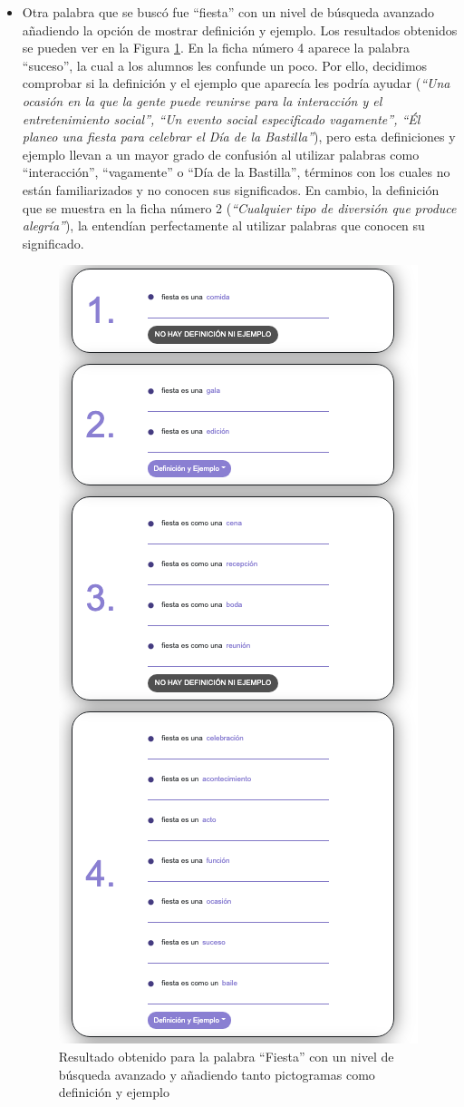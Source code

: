 \begin{itemize}
	\item Otra palabra que se buscó fue ``fiesta'' con un nivel de búsqueda avanzado añadiendo la opción de mostrar definición y ejemplo. Los resultados obtenidos se pueden ver en la Figura \ref{fig:fiestaAvanzado}. En la ficha número 4 aparece la palabra ``suceso'', la cual a los alumnos les confunde un poco.
	Por ello, decidimos comprobar si la definición y el ejemplo que aparecía les podría ayudar (\textit{``Una ocasión en la que la gente puede reunirse para la interacción y el entretenimiento social'', ``Un evento social especificado vagamente'', ``Él planeo una fiesta para celebrar el Día de la Bastilla''}), pero esta definiciones y ejemplo llevan a un mayor grado de confusión al utilizar palabras como ``interacción'', ``vagamente'' o ``Día de la Bastilla'', términos con los cuales no están familiarizados y no conocen sus significados. En cambio, la definición que se muestra en la ficha número 2 (\textit{``Cualquier tipo de diversión que produce alegría''}), la entendían perfectamente al utilizar palabras que conocen su significado.
	\begin{figure}[!h]
		\includegraphics[width=.7\textwidth]{Imagenes/Bitmap/Capitulo4/EvaluacionFinal/3fiestaavanzadodef.png}
		\centering
		\caption{Resultado obtenido para la palabra ``Fiesta'' con un nivel de búsqueda avanzado y añadiendo tanto pictogramas como definición y ejemplo}
		\label{fig:fiestaAvanzado}
	\end{figure}
	

\end{itemize}

